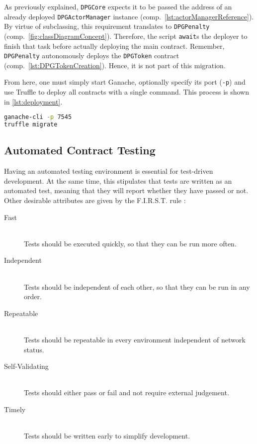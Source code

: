 As previously explained, \texttt{DPGCore} expects it to be passed the address of an already deployed \texttt{DPGActorManager} instance (comp.~\autoref{lst:actorManagerReference}). By virtue of subclassing, this requirement translates to \texttt{DPGPenalty} (comp.~\autoref{fig:classDiagramConcept}). Therefore, the script \texttt{await}s the deployer to finish that task before actually deploying the main contract. Remember, \texttt{DPGPenalty} autonomously deploys the \texttt{DPGToken} contract (comp.~\ref{lst:DPGTokenCreation}). Hence, it is not part of this migration.

From here, one must simply start Ganache, optionally specify its port (\texttt{-p}) and use Truffle to deploy all contracts with a single command. This process is shown in \autoref{lst:deployment}.

\begin{lstlisting}[language=bash, caption=Deploying to Ganache, label=lst:deployment]
ganache-cli -p 7545
truffle migrate
\end{lstlisting}

\subsection{Automated Contract Testing}
Having an automated testing environment is essential for test-driven development. At the same time, this stipulates that tests are written as an automated test, meaning that they will report whether they have passed or not. Other desirable attributes are given by the F.I.R.S.T. rule \cite[p.~132]{firstUnitTests}:

\begin{description}
	\item[Fast]
  	\hfill \\
  	Tests should be executed quickly, so that they can be run more often.
  	\item[Independent]
  	\hfill \\
  	Tests should be independent of each other, so that they can be run in any order.
  	\item[Repeatable]
  	\hfill \\  
	Tests should be repeatable in every environment independent of network status. 
  	\item[Self-Validating]
  	\hfill \\  
  	Tests should either pass or fail and not require external judgement.
	\item[Timely]
  	\hfill \\  
  	Tests should be written early to simplify development.
\end{description}

